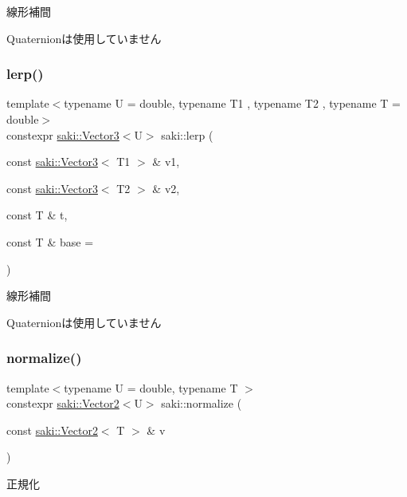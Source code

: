 線形補間 

Quaternionは使用していません \mbox{\label{namespacesaki_a869e38d6d36699cc305e7bd15d6d3123}} 
\subsubsection{\texorpdfstring{lerp()}{lerp()}\hspace{0.1cm}{\footnotesize\ttfamily [3/3]}}
{\footnotesize\ttfamily template$<$typename U  = double, typename T1 , typename T2 , typename T  = double$>$ \\
constexpr \mbox{\hyperlink{classsaki_1_1_vector3}{saki\+::\+Vector3}}$<$U$>$ saki\+::lerp (\begin{DoxyParamCaption}\item[{const \mbox{\hyperlink{classsaki_1_1_vector3}{saki\+::\+Vector3}}$<$ T1 $>$ \&}]{v1,  }\item[{const \mbox{\hyperlink{classsaki_1_1_vector3}{saki\+::\+Vector3}}$<$ T2 $>$ \&}]{v2,  }\item[{const T \&}]{t,  }\item[{const T \&}]{base = {} }\end{DoxyParamCaption})}



線形補間 

Quaternionは使用していません \mbox{\label{namespacesaki_a333cfdbbc10458e1e2d59dbba448b19c}} 
\subsubsection{\texorpdfstring{normalize()}{normalize()}\hspace{0.1cm}{\footnotesize\ttfamily [1/3]}}
{\footnotesize\ttfamily template$<$typename U  = double, typename T $>$ \\
constexpr \mbox{\hyperlink{classsaki_1_1_vector2}{saki\+::\+Vector2}}$<$U$>$ saki\+::normalize (\begin{DoxyParamCaption}\item[{const \mbox{\hyperlink{classsaki_1_1_vector2}{saki\+::\+Vector2}}$<$ T $>$ \&}]{v }\end{DoxyParamCaption})}



正規化 

